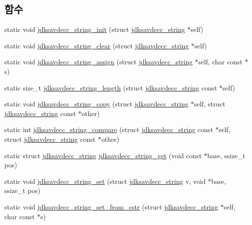 \subsection*{함수}
\begin{DoxyCompactItemize}
\item 
static void \hyperlink{group__string_ga282550e12667263da2370af829d4f6b1}{jdksavdecc\+\_\+string\+\_\+init} (struct \hyperlink{structjdksavdecc__string}{jdksavdecc\+\_\+string} $\ast$self)
\item 
static void \hyperlink{group__string_ga512c23569ce693ae04af78958e6190c7}{jdksavdecc\+\_\+string\+\_\+clear} (struct \hyperlink{structjdksavdecc__string}{jdksavdecc\+\_\+string} $\ast$self)
\item 
static void \hyperlink{group__string_gab7bfad63fdcf37ece563940f2b662f5b}{jdksavdecc\+\_\+string\+\_\+assign} (struct \hyperlink{structjdksavdecc__string}{jdksavdecc\+\_\+string} $\ast$self, char const $\ast$s)
\item 
static size\+\_\+t \hyperlink{group__string_ga1b0d27a75ef5b6f6ea5fa80e5977058e}{jdksavdecc\+\_\+string\+\_\+length} (struct \hyperlink{structjdksavdecc__string}{jdksavdecc\+\_\+string} const $\ast$self)
\item 
static void \hyperlink{group__string_ga0c495f761ca952b173d857c14c013f18}{jdksavdecc\+\_\+string\+\_\+copy} (struct \hyperlink{structjdksavdecc__string}{jdksavdecc\+\_\+string} $\ast$self, struct \hyperlink{structjdksavdecc__string}{jdksavdecc\+\_\+string} const $\ast$other)
\item 
static int \hyperlink{group__string_ga84e08921e69f4f8594d31790ca782500}{jdksavdecc\+\_\+string\+\_\+compare} (struct \hyperlink{structjdksavdecc__string}{jdksavdecc\+\_\+string} const $\ast$self, struct \hyperlink{structjdksavdecc__string}{jdksavdecc\+\_\+string} const $\ast$other)
\item 
static struct \hyperlink{structjdksavdecc__string}{jdksavdecc\+\_\+string} \hyperlink{group__string_gac994cf59581d4763007c36c38f86b6f6}{jdksavdecc\+\_\+string\+\_\+get} (void const $\ast$base, ssize\+\_\+t pos)
\item 
static void \hyperlink{group__string_gaffb2c926e982b532e0657e814afc0395}{jdksavdecc\+\_\+string\+\_\+set} (struct \hyperlink{structjdksavdecc__string}{jdksavdecc\+\_\+string} v, void $\ast$base, ssize\+\_\+t pos)
\item 
static void \hyperlink{group__string_ga3eed142f4990fdbbbe892045769e1b4f}{jdksavdecc\+\_\+string\+\_\+set\+\_\+from\+\_\+cstr} (struct \hyperlink{structjdksavdecc__string}{jdksavdecc\+\_\+string} $\ast$self, char const $\ast$s)

\end{DoxyCompactItemize}
